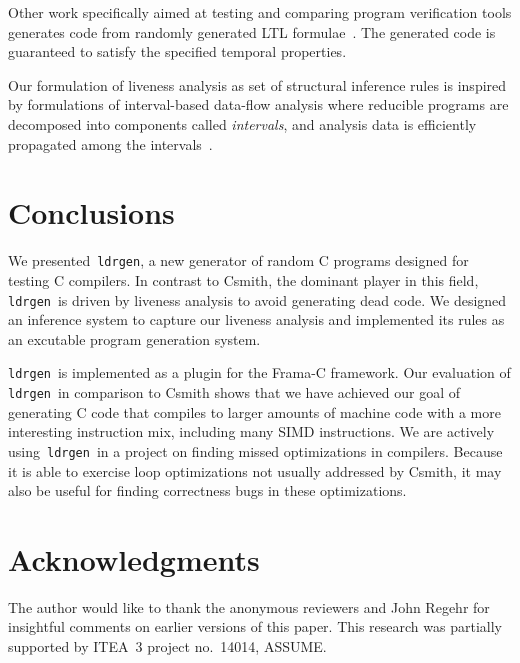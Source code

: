 \documentclass[a4paper]{easychair}
\newcommand\ldrgen{\texttt{ldrgen}}
\begin{document}
Other work specifically aimed at testing and comparing program verification
tools generates code from randomly generated LTL
formulae~\cite{steffen.etal-2014}. The generated code is guaranteed to
satisfy the specified temporal properties.

Our formulation of liveness analysis as set of structural inference rules is
inspired by formulations of interval-based data-flow analysis where
reducible programs are decomposed into components called \emph{intervals},
and analysis data is efficiently propagated among the
intervals~\cite{allen-1970,cocke-1970,graham.wegman-1976}.

\section{Conclusions}

We presented~\ldrgen, a new generator of random C programs designed for
testing C compilers. In contrast to Csmith, the dominant player in this
field, \ldrgen\ is driven by liveness analysis to avoid generating dead
code. We designed an inference system to capture our liveness analysis and
implemented its rules as an excutable program generation system.

\ldrgen\ is implemented as a plugin for the Frama-C framework. Our
evaluation of \ldrgen\ in comparison to Csmith shows that we have achieved
our goal of generating C code that compiles to larger amounts of machine
code with a more interesting instruction mix, including many SIMD
instructions. We are actively using~\ldrgen\ in a project on finding missed
optimizations in compilers. Because it is able to exercise loop
optimizations not usually addressed by Csmith, it may also be useful for
finding correctness bugs in these optimizations.

\section*{Acknowledgments}

The author would like to thank the anonymous reviewers and John Regehr for
insightful comments on earlier versions of this paper.
This research was partially supported by ITEA~3 project no.~14014, ASSUME.




\end{document}
